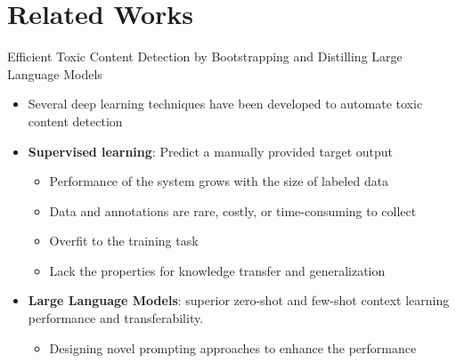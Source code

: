\section{Related Works}


\begin{frame}{Efficient Toxic Content Detection by Bootstrapping and Distilling Large Language Models}

\begin{itemize}

  \item Several deep learning techniques have been developed to automate toxic content detection 

  \item \textbf{Supervised learning}: Predict a manually provided target output
    \begin{itemize}
      \item Performance of the system grows with the size of labeled data 
      \item Data and annotations are rare, costly, or time-consuming to collect
      \item Overfit to the training task
      \item  Lack the properties for knowledge transfer and generalization
    \end{itemize}

  \item \textbf{Large Language Models}: superior zero-shot and few-shot context learning performance and transferability.
  \begin{itemize}
    \item Designing novel prompting approaches to enhance the performance
  \end{itemize}

\end{itemize}

\end{frame}


